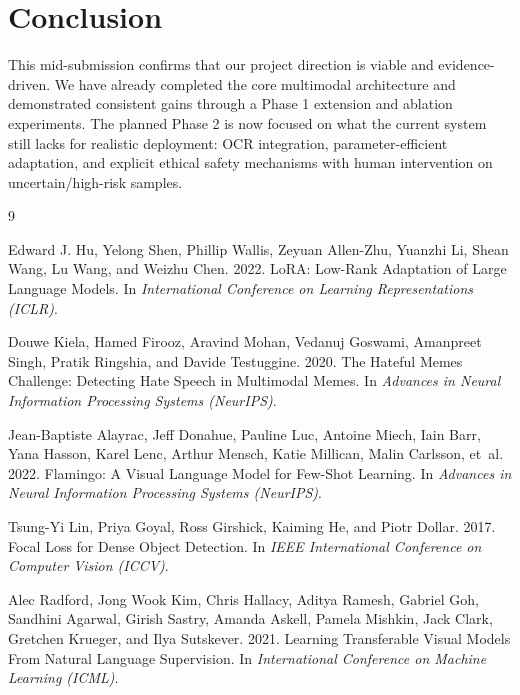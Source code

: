 \documentclass[11pt]{article}
\begin{document}
\section{Conclusion}
This mid-submission confirms that our project direction is viable and evidence-driven. We have already completed the core multimodal architecture and demonstrated consistent gains through a Phase 1 extension and ablation experiments. The planned Phase 2 is now focused on what the current system still lacks for realistic deployment: OCR integration, parameter-efficient adaptation, and explicit ethical safety mechanisms with human intervention on uncertain/high-risk samples.

\begin{thebibliography}{9}

Edward J. Hu, Yelong Shen, Phillip Wallis, Zeyuan Allen-Zhu, Yuanzhi Li,
Shean Wang, Lu Wang, and Weizhu Chen. 2022.
\newblock LoRA: Low-Rank Adaptation of Large Language Models.
\newblock In \textit{International Conference on Learning Representations (ICLR)}.

Douwe Kiela, Hamed Firooz, Aravind Mohan, Vedanuj Goswami,
Amanpreet Singh, Pratik Ringshia, and Davide Testuggine. 2020.
\newblock The Hateful Memes Challenge: Detecting Hate Speech in Multimodal Memes.
\newblock In \textit{Advances in Neural Information Processing Systems (NeurIPS)}.

Jean-Baptiste Alayrac, Jeff Donahue, Pauline Luc, Antoine Miech,
Iain Barr, Yana Hasson, Karel Lenc, Arthur Mensch, Katie Millican,
Malin Carlsson, et~al. 2022.
\newblock Flamingo: A Visual Language Model for Few-Shot Learning.
\newblock In \textit{Advances in Neural Information Processing Systems (NeurIPS)}.

Tsung-Yi Lin, Priya Goyal, Ross Girshick, Kaiming He, and Piotr Dollar. 2017.
\newblock Focal Loss for Dense Object Detection.
\newblock In \textit{IEEE International Conference on Computer Vision (ICCV)}.

Alec Radford, Jong Wook Kim, Chris Hallacy, Aditya Ramesh, Gabriel Goh,
Sandhini Agarwal, Girish Sastry, Amanda Askell, Pamela Mishkin,
Jack Clark, Gretchen Krueger, and Ilya Sutskever. 2021.
\newblock Learning Transferable Visual Models From Natural Language Supervision.
\newblock In \textit{International Conference on Machine Learning (ICML)}.


\end{thebibliography}
\end{document}
